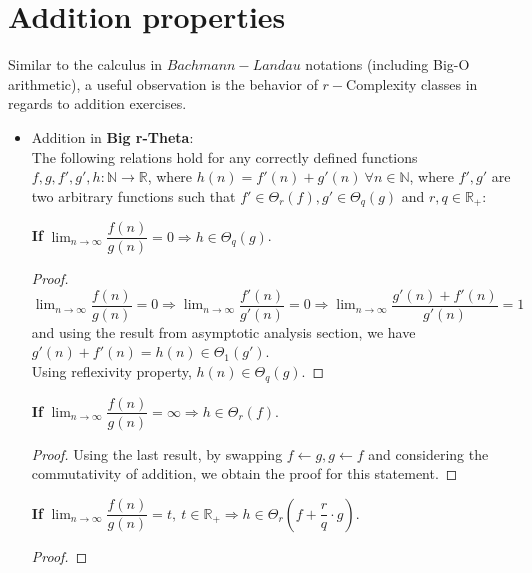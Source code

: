 \section{Addition properties}
Similar to the calculus in $Bachmann-Landau$ notations (including Big-O arithmetic), a useful observation is the behavior of $r-$Complexity classes in regards to addition exercises. 



\begin{itemize}
  \item Addition in \textbf{Big r-Theta}:  \\
The following relations hold for any correctly defined functions $f, g, f', g', h:\mathbb{N}\longrightarrow\mathbb{R}$, where $ h(n) = f'(n) + g'(n)\  \forall n \in  \mathbb{N} $, where $f',g'$ are two arbitrary functions such that $ f' \in \Theta_{r}(f),  g' \in \Theta_{q}(g) $ and $r,q \in \mathbb{R}_{+}$:  
\begin{theorem} 
  \textbf{If} $ \lim_{n\to\infty} \dfrac{f(n)}{g(n)} = 0 \Rightarrow  h \in \Theta_{q}(g) $. \\
\end{theorem} 
\begin{proof} 
$ \lim_{n\to\infty} \dfrac{f(n)}{g(n)} = 0 \Rightarrow \lim_{n\to\infty} \dfrac{f'(n)}{g'(n)} = 0 \Rightarrow \lim_{n\to\infty} \dfrac{g'(n) + f'(n)}{g'(n)} = 1 $ and using the result from asymptotic analysis section, we have $ g'(n) + f'(n) = h(n) \in \Theta_{1}(g')$. \\ Using reflexivity property, $ h(n) \in \Theta_{q}(g)$.
\end{proof} 

\begin{theorem} 
  \textbf{If} $ \lim_{n\to\infty} \dfrac{f(n)}{g(n)} = \infty \Rightarrow  h \in \Theta_{r}(f) $. \\
\end{theorem} 
\begin{proof} 
Using the last result, by swapping $f \leftarrow g, g \leftarrow f$ and considering the commutativity of addition, we obtain the proof for this statement.
\end{proof} 


\begin{theorem} 
  \textbf{If} $ \lim_{n\to\infty} \dfrac{f(n)}{g(n)} = t, \ t \in \mathbb{R}_{+} \Rightarrow  h \in \Theta_{r} \left( f + \dfrac{r}{q} \cdot g \right) $. \\
\end{theorem} 
\begin{proof} 


\end{proof}
\end{itemize}
